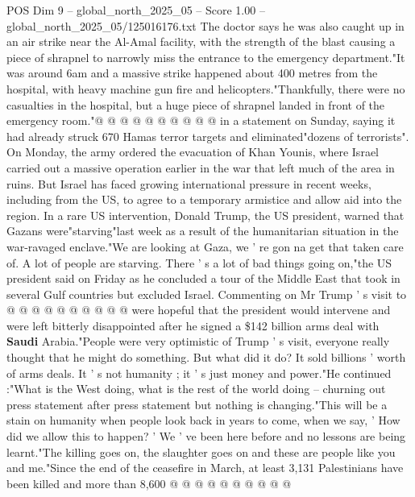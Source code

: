 \begin{textsample}{POS Dim 9 – global\_north\_2025\_05 – Score 1.00 – global\_north\_2025\_05/125016176.txt}
The doctor says he was also caught up in an air strike near the Al-Amal facility, with the strength of the blast causing a piece of shrapnel to narrowly miss the entrance to the emergency department."It was around 6am and a massive strike happened about 400 metres from the hospital, with heavy machine gun fire and helicopters."Thankfully, there were no casualties in the hospital, but a huge piece of shrapnel landed in front of the emergency room."@ @ @ @ @ @ @ @ @ @ in a statement on Sunday, saying it had already struck 670 Hamas terror targets and eliminated"dozens of terrorists".
On Monday, the army ordered the evacuation of Khan Younis, where Israel carried out a massive operation earlier in the war that left much of the area in ruins.
But Israel has faced growing international pressure in recent weeks, including from the US, to agree to a temporary armistice and allow aid into the region.
In a rare US intervention, Donald Trump, the US president, warned that Gazans were"starving"last week as a result of the humanitarian situation in the war-ravaged enclave."We are looking at Gaza, we ' re gon na get that taken care of.
A lot of people are starving.
There ' s a lot of bad things going on,"the US president said on Friday as he concluded a tour of the Middle East that took in several Gulf countries but excluded Israel.
Commenting on Mr Trump ' s visit to @ @ @ @ @ @ @ @ @ @ were hopeful that the president would intervene and were left bitterly disappointed after he signed a \$142 billion arms deal with \textbf{Saudi} Arabia."People were very optimistic of Trump ' s visit, everyone really thought that he might do something.
But what did it do?
It sold billions ' worth of arms deals.
It ' s not humanity ; it ' s just money and power."He continued :"What is the West doing, what is the rest of the world doing -- churning out press statement after press statement but nothing is changing."This will be a stain on humanity when people look back in years to come, when we say, ' How did we allow this to happen? ' We ' ve been here before and no lessons are being learnt."The killing goes on, the slaughter goes on and these are people like you and me."Since the end of the ceasefire in March, at least 3,131 Palestinians have been killed and more than 8,600 @ @ @ @ @ @ @ @ @ @

\end{textsample}

